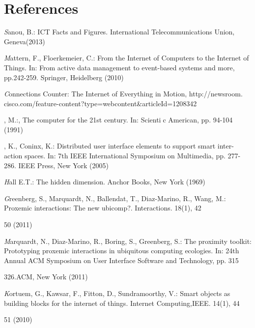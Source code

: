 \documentclass{article}
\begin{document}
\section{References}
\begin{enumerate}


    \item \textit Sanou, B.: ICT Facts and Figures. International Telecommunications Union, Geneva(2013)
    \item \textit Mattern, F., Floerkemeier, C.: From the Internet of Computers to the Internet of Things. In: From active data management to event-based systems and more, pp.242-259. Springer, Heidelberg (2010)
    \item \textit Connections Counter: The Internet of Everything in Motion, http://newsroom. cisco.com/feature-content?type=webcontent&articleId=1208342
    \item \textitWeiser, M.:, The computer for the 21st century. In: Scientic American, pp. 94-104
(1991)
    \item \textitLuyten, K., Coninx, K.: Distributed user interface elements to support smart inter-
action spaces. In: 7th IEEE International Symposium on Multimedia, pp. 277-286.
IEEE Press, New York (2005)
    \item \textit Hall E.T.: The hidden dimension. Anchor Books, New York (1969)
    \item \textit Greenberg, S., Marquardt, N., Ballendat, T., Diaz-Marino, R., Wang, M.: Proxemic
interactions: The new ubicomp?. Interactions. 18(1), 42{50 (2011)
    \item \textit  Marquardt, N., Diaz-Marino, R., Boring, S., Greenberg, S.: The proximity toolkit:
Prototyping proxemic interactions in ubiquitous computing ecologies. In: 24th Annual ACM Symposium on User Interface Software and Technology, pp. 315{326.ACM, New York (2011)
    
    \item \textit  Kortuem, G., Kawsar, F., Fitton, D., Sundramoorthy, V.: Smart objects as building blocks for the internet of things. Internet Computing,IEEE. 14(1), 44{51 (2010) 
    
}}}
\end{enumerate}
\end{document}
